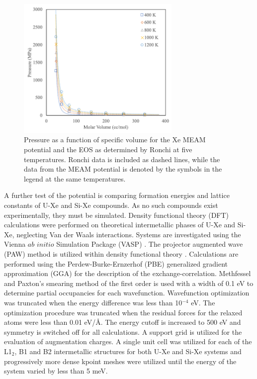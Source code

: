 \documentclass[review]{elsarticle}
\begin{document}
\begin{figure}[hbt]
	\centering
	\includegraphics[width=0.7\textwidth]{Xe_T_PvsV.png}
 \caption{Pressure as a function of specific volume for the Xe MEAM potential and the EOS as determined by Ronchi \cite{ronchi1981} at five temperatures. Ronchi data is included as dashed lines, while the data from the MEAM potential is denoted by the symbols in the legend at the same temperatures. }\label{fig:xe_eos}
\end{figure}

\FloatBarrier

A further test of the potential is comparing formation energies and lattice constants of U-Xe and Si-Xe compounds. As no such compounds exist experimentally, they must be simulated. Density functional theory (DFT) calculations were performed on theoretical intermetallic phases of U-Xe and Si-Xe, neglecting Van der Waals interactions. Systems are investigated using the Vienna $\textit{ab initio}$ Simulation Package (VASP) \cite{vasp1, vasp2, vasp3, vasp4}. The projector augmented wave (PAW) method \cite{paw1, paw2} is utilized within density functional theory \cite{dft1, dft2}. Calculations are performed using the Perdew-Burke-Ernzerhof (PBE) \cite{pbe1, pbe2} generalized gradient approximation (GGA) for the description of the exchange-correlation. Methfessel and Paxton's smearing method \cite{methfessel} of the first order is used with a width of 0.1 eV to determine partial occupancies for each wavefunction. Wavefunction optimization was truncated when the energy difference was less than 10$^{-4}$ eV. The optimization procedure was truncated when the residual forces for the relaxed atoms were less than 0.01 eV/{\AA}. The energy cutoff is increased to 500 eV and symmetry is switched off for all calculations. A support grid is utilized for the evaluation of augmentation charges. A single unit cell was utilized for each of the L1$_2$, B1 and B2 intermetallic structures for both U-Xe and Si-Xe systems and progressively more dense kpoint meshes were utilized until the energy of the system varied by less than 5 meV. 
\end{document}
